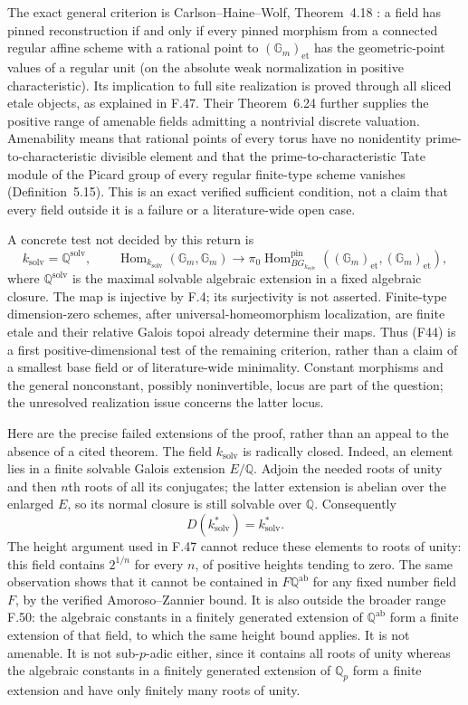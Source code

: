 The exact general criterion is Carlson--Haine--Wolf,
Theorem~4.18 \citep{CHW2024}: a field has pinned reconstruction if
and only if every pinned morphism from a connected regular affine
scheme with a rational point to $(\mathbb G_m)_{\mathrm{et}}$
has the geometric-point values of a regular unit (on the absolute
weak normalization in positive characteristic). Its implication to
full site realization is proved through all sliced etale objects,
as explained in F.47. Their Theorem~6.24 further supplies the
positive range of amenable fields admitting a nontrivial discrete
valuation. Amenability means that rational points of every torus
have no nonidentity prime-to-characteristic divisible element and
that the prime-to-characteristic Tate module of the Picard group of
every regular finite-type scheme vanishes (Definition~5.15).
This is an exact verified sufficient condition, not a claim that
every field outside it is a failure or a literature-wide open case.

A concrete test not decided by this return is
\[
 k_{\mathrm{solv}}=\mathbb Q^{\mathrm{solv}},\qquad
 \operatorname{Hom}_{k_{\mathrm{solv}}}(\mathbb G_m,\mathbb G_m)
 \longrightarrow
 \pi_0\operatorname{Hom}^{\mathrm{pin}}_{B G_{k_{\mathrm{solv}}}}
       ((\mathbb G_m)_{\mathrm{et}},(\mathbb G_m)_{\mathrm{et}}),
 \tag{F44}
\]
where $\mathbb Q^{\mathrm{solv}}$ is the maximal solvable algebraic
extension in a fixed algebraic closure. The map is injective by
F.4; its surjectivity is not asserted. Finite-type dimension-zero
schemes, after universal-homeomorphism localization, are finite
etale and their relative Galois topoi already determine their maps.
Thus (F44) is a first positive-dimensional test of the remaining
criterion, rather than a claim of a smallest base field or of
literature-wide minimality. Constant morphisms and the general
nonconstant, possibly noninvertible, locus are part of the question;
the unresolved realization issue concerns the latter locus.

Here are the precise failed extensions of the proof, rather than
an appeal to the absence of a cited theorem. The field
$k_{\mathrm{solv}}$ is radically closed. Indeed, an element lies
in a finite solvable Galois extension $E/\mathbb Q$. Adjoin the
needed roots of unity and then $n$th roots of all its conjugates;
the latter extension is abelian over the enlarged $E$, so its
normal closure is still solvable over $\mathbb Q$. Consequently
\[
       D(k_{\mathrm{solv}}^*)=k_{\mathrm{solv}}^*.
\]
The height argument used in F.47 cannot reduce these elements to
roots of unity: this field contains $2^{1/n}$ for every $n$, of
positive heights tending to zero. The same observation shows that
it cannot be contained in $F\mathbb Q^{\mathrm{ab}}$ for any
fixed number field $F$, by the verified Amoroso--Zannier bound.
It is also outside the broader range F.50: the algebraic constants
in a finitely generated extension of $\mathbb Q^{\mathrm{ab}}$
form a finite extension of that field, to which the same height
bound applies.
It is not amenable. It is not sub-$p$-adic either, since it contains
all roots of unity whereas the algebraic constants in a finitely
generated extension of $\mathbb Q_p$ form a finite extension and
have only finitely many roots of unity.

